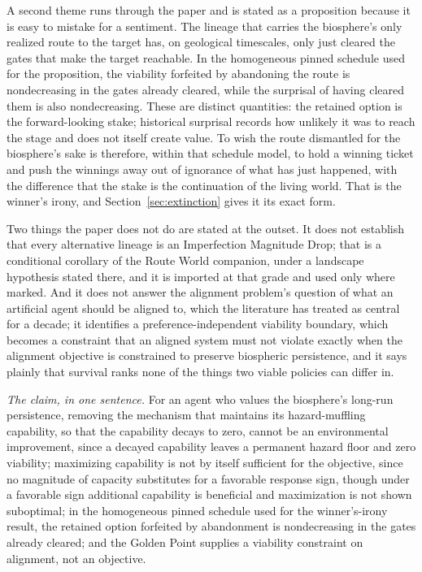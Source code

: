 A second theme runs through the paper and is stated as a proposition
because it is easy to mistake for a sentiment. The lineage that carries
the biosphere's only realized route to the target has, on geological
timescales, only just cleared the gates that make the target reachable.
In the homogeneous pinned schedule used for the proposition, the
viability forfeited by abandoning the route is nondecreasing in the
gates already cleared, while the surprisal of having cleared them is
also nondecreasing. These are distinct quantities: the retained option
is the forward-looking stake; historical surprisal records how unlikely
it was to reach the stage and does not itself create value. To wish the
route dismantled for the biosphere's sake is therefore, within that
schedule model, to hold a winning ticket and push the winnings away out
of ignorance of what has just happened, with the difference that the
stake is the continuation of the living world. That is the winner's
irony, and Section~\ref{sec:extinction} gives it its exact form.

Two things the paper does not do are stated at the outset. It does not
establish that every alternative lineage is an Imperfection Magnitude
Drop; that is a conditional corollary of the Route World companion,
under a landscape hypothesis stated there, and it is imported at that
grade and used only where marked. And it does not answer the alignment
problem's question of what an artificial agent should be aligned to,
which the literature has treated as central for a decade; it identifies a
preference-independent viability boundary, which becomes a constraint
that an aligned system must not violate exactly when the alignment
objective is constrained to preserve biospheric persistence, and it
says plainly that survival ranks none of the things two viable policies
can differ in.

\emph{The claim, in one sentence.} For an agent who values the
biosphere's long-run persistence, removing the mechanism that
maintains its hazard-muffling capability, so that the capability decays
to zero, cannot be an environmental improvement, since a decayed
capability leaves a permanent hazard floor and zero viability;
maximizing capability is not by itself sufficient for the objective, since no magnitude of capacity substitutes for a favorable response sign, though under a favorable sign additional capability is beneficial and maximization is not shown suboptimal; in the
homogeneous pinned schedule used for the winner's-irony result, the
retained option forfeited by abandonment is nondecreasing in the gates
already cleared; and the Golden Point supplies a viability constraint on
alignment, not an objective.

